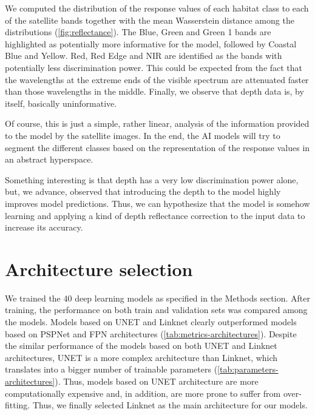 We computed the distribution of the response values of each habitat class
to each of the satellite bands together with the mean Wasserstein distance
among the distributions (\cref{fig:reflectance}). The Blue, Green and Green 1
bands are highlighted as potentially more informative for the model, followed
by Coastal Blue and Yellow. Red, Red Edge and NIR are identified as the bands
with potentially less discrimination power. This could be expected from the
fact that the wavelengths at the extreme ends of the visible spectrum are
attenuated faster than those wavelengths in the middle. Finally, we observe
that depth data is, by itself, basically uninformative.

Of course, this is just a simple, rather linear, analysis of the
information provided to the model by the satellite images. In the end, the AI
models will try to segment the different classes based on the representation of
the response values in an abstract hyperspace.

Something interesting is that depth has a very low discrimination power
alone, but, we advance, observed that introducing the depth to the model highly
improves model predictions. Thus, we can hypothesize that the model is somehow
learning and applying a kind of depth reflectance correction to the input data
to increase its accuracy.

\section{Architecture selection}\label{app:architecture_selection}

We trained the 40 deep learning models as specified in the Methods
section. After training, the performance on both train and validation sets was
compared among the models. Models based on UNET and Linknet clearly
outperformed models based on PSPNet and FPN architectures
(\cref{tab:metrics-architectures}). Despite the similar performance of the
models based on both UNET and Linknet architectures, UNET is a more complex
architecture than Linknet, which translates into a bigger number of trainable
parameters (\cref{tab:parameters-architectures}). Thus, models based on UNET
architecture are more computationally expensive and, in addition, are more
prone to suffer from over-fitting. Thus, we finally selected Linknet as the
main architecture for our models.

